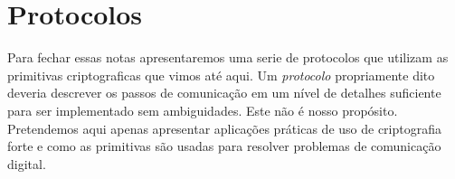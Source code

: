 \chapter{Protocolos}
\label{cha:protocolos}

Para fechar essas notas apresentaremos uma serie de protocolos que utilizam as primitivas criptograficas que vimos até aqui.
Um {\em protocolo} propriamente dito deveria descrever os passos de comunicação em um nível de detalhes suficiente para ser implementado sem ambiguidades.
Este não é nosso propósito.
Pretendemos aqui apenas apresentar aplicações práticas de uso de criptografia forte e como as primitivas são usadas para resolver problemas de comunicação digital.





